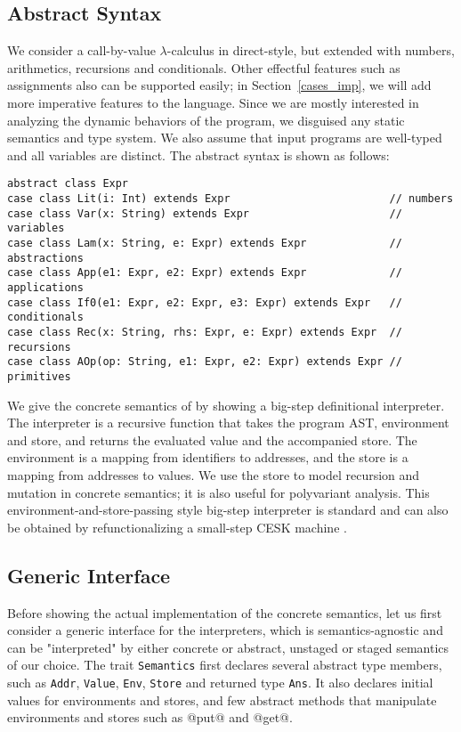 \subsection{Abstract Syntax} \label{bg_lang}

We consider a call-by-value $\lambda$-calculus in direct-style, but extended
with numbers, arithmetics, recursions and conditionals. Other effectful features
such as assignments also can be supported easily; in Section~\ref{cases_imp}, we
will add more imperative features to the language. Since we are mostly
interested in analyzing the dynamic behaviors of the program, we disguised any
static semantics and type system. We also assume that input programs are
well-typed and all variables are distinct. The abstract syntax is shown as
follows:

\begin{lstlisting}
abstract class Expr
case class Lit(i: Int) extends Expr                         // numbers
case class Var(x: String) extends Expr                      // variables
case class Lam(x: String, e: Expr) extends Expr             // abstractions
case class App(e1: Expr, e2: Expr) extends Expr             // applications
case class If0(e1: Expr, e2: Expr, e3: Expr) extends Expr   // conditionals
case class Rec(x: String, rhs: Expr, e: Expr) extends Expr  // recursions
case class AOp(op: String, e1: Expr, e2: Expr) extends Expr // primitives
\end{lstlisting}

We give the concrete semantics of \TLang by showing a big-step definitional
interpreter. The interpreter is a recursive function that takes the program AST,
environment and store, and returns the evaluated value and the accompanied
store. The environment is a mapping from identifiers to addresses, and the store
is a mapping from addresses to values. We use the store to model recursion and
mutation in concrete semantics; it is also useful for polyvariant analysis. This
environment-and-store-passing style big-step interpreter is standard and can
also be obtained by refunctionalizing \cite{DBLP:conf/ppdp/AgerBDM03,
Wei:2018:RAA:3243631.3236800} a small-step CESK machine
\cite{DBLP:conf/popl/FelleisenF87}.

\subsection{Generic Interface} \label{generic_if}

Before showing the actual implementation of the concrete semantics, let us first
consider a generic interface for the interpreters, which is semantics-agnostic
and can be "interpreted" by either concrete or abstract, unstaged or staged
semantics of our choice. The trait \texttt{Semantics} first declares several
abstract type members, such as \texttt{Addr}, \texttt{Value}, \texttt{Env},
\texttt{Store} and returned type \texttt{Ans}. It also declares initial values
for environments and stores, and few abstract methods that manipulate
environments and stores such as @put@ and @get@.

